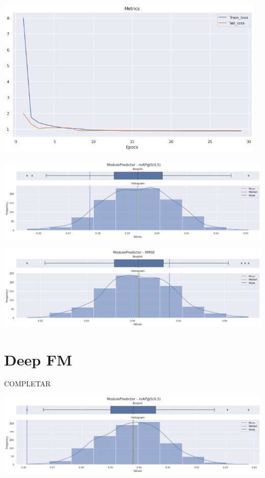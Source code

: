 \documentclass[11pt,a4paper,twoside]{thesis}
\begin{document}
\begin{center}
	\includegraphics[width=13cm]{./images/metrics-NN-FM-train-val-loss.png}
\end{center}

\begin{center}
	\includegraphics[width=15cm]{./images/metrics-NN-FM-mapk.png}
\end{center}

\begin{center}
	\includegraphics[width=15cm]{./images/metrics-NN-FM-RMSE.png}
\end{center}

\section{Deep FM}

COMPLETAR

\begin{center}
	\includegraphics[width=15cm]{./images/metrics-DeepFM-mapk.png}
\end{center}
\end{document}

